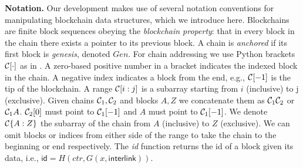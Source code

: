 \noindent
\textbf{Notation.}
Our development makes use of several notation conventions for manipulating
blockchain data structures, which we introduce here.
Blockchains are finite
block sequences obeying the \emph{blockchain property}: that in every block in
the chain there exists a pointer to its previous block. A chain is
\emph{anchored} if its first block is \emph{genesis}, denoted $Gen$.
For chain addressing we use Python brackets $\mathcal{C}[\cdot]$ as in
\cite{fruitchains}. A zero-based positive number in a bracket indicates the
indexed block in the chain. A negative index indicates a block from the end,
e.g., $\mathcal{C}[-1]$ is the tip of the blockchain. A range $\mathcal{C}[i:j]$ is a
subarray starting from $i$ (inclusive) to j (exclusive).
Given chains $\mathcal{C}_1, \mathcal{C}_2$ and blocks $A, Z$ we concatenate them as
$\mathcal{C}_1 \mathcal{C}_2$ or $\mathcal{C}_1 A$. $\mathcal{C}_2[0]$ must point to $\mathcal{C}_1[-1]$
and $A$ must point to $\mathcal{C}_1[-1]$. We denote $\mathcal{C}\{A:Z\}$ the subarray of
the chain from $A$ (inclusive) to $Z$ (exclusive). We can omit blocks or indices
from either side of the range to take the chain to the beginning or end
respectively.
The \emph{id} function
returns the id of a block given its data, i.e., $\textsf{id} = H(ctr, G(x,
\textsf{interlink}))$.
